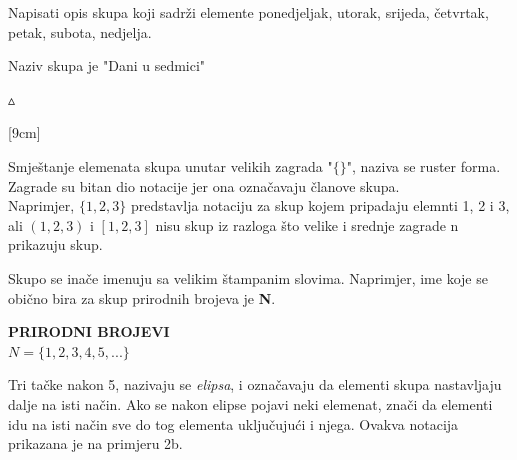 \documentclass[a4paper,14pt,svgnames]{article}
\newcounter{counter}
\newcommand{\examplecounter}{\textbf{\refstepcounter{counter}PRIMJER \thecounter}}
\newcommand{\example}[3]{\begin{tcolorbox}[breakable,title=\large \examplecounter \hfill\small\textbf{"#1"},pad at break=1mm]
#2
\begin{tcolorbox}[breakable,title=\small \textbf{RJEŠENJE},colback=white,pad at break=1mm]
\begin{center}
#3

\vspace{0.5em}\hfill $\vartriangle$
\end{center}
\end{tcolorbox}
\end{tcolorbox}}
\begin{document}
\example{Opis skupova}{Napisati opis skupa koji sadrži elemente ponedjeljak, utorak, srijeda, četvrtak, petak, subota, nedjelja.}{Naziv skupa je "Dani u sedmici"}\medskip

\reversemarginpar
\color{white}
[9cm]
\color{black}

Smještanje elemenata skupa unutar velikih zagrada "$\{ \}$", naziva se ruster forma. Zagrade su bitan dio notacije jer ona označavaju članove skupa.\\
Naprimjer, $\{1, 2, 3\}$ predstavlja notaciju za skup kojem pripadaju elemnti 1, 2 i 3, ali $(1, 2, 3)$ i $[1, 2, 3]$ nisu skup iz razloga što velike i srednje zagrade n prikazuju skup.\medskip

Skupo se inače imenuju sa velikim štampanim slovima. Naprimjer, ime koje se obično bira za skup prirodnih brojeva je \textbf{N}.\\
\begin{tcolorbox}
\begin{center}
\textbf{\textsc{PRIRODNI BROJEVI}}\\
$N = \{1, 2, 3, 4, 5, ... \}$
\end{center}
\end{tcolorbox}\medskip

Tri tačke nakon 5, nazivaju se \textit{elipsa}, i označavaju da elementi skupa nastavljaju dalje na isti način. Ako se nakon elipse pojavi neki elemenat, znači da elementi idu na isti način sve do tog elementa uključujući i njega. Ovakva notacija prikazana je na primjeru 2b.\bigskip
\end{document}
